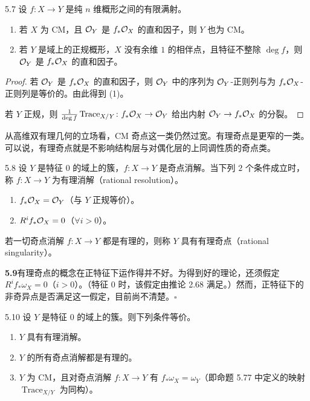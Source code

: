 
\begin{propositionp}{5.7}
设 $f\colon X\to Y$ 是纯 $n$ 维概形之间的有限满射。
\begin{enumerate}[label=(\arabic*),leftmargin=*]
\item 若 $X$ 为 CM，且 $\mathcal{O}_Y$ 是 $f_*\mathcal{O}_X$ 的直和因子，则 $Y$ 也为 CM。
\item 若 $Y$ 是域上的正规概形，$X$ 没有余维 $1$ 的相伴点，且特征不整除 $\deg f$，则 $\mathcal{O}_Y$ 是 $f_*\mathcal{O}_X$ 的直和因子。
\end{enumerate}
\end{propositionp}

\begin{proof}
若 $\mathcal{O}_Y$ 是 $f_*\mathcal{O}_X$ 的直和因子，则 $\mathcal{O}_Y$ 中的序列为 $\mathcal{O}_Y$-正则列与为 $f_*\mathcal{O}_X$-正则列是等价的。由此得到 (1)。

若 $Y$ 正规，则 $\frac{1}{\deg f}\operatorname{Trace}_{X/Y}\colon f_*\mathcal{O}_X\to\mathcal{O}_Y$ 给出内射 $\mathcal{O}_Y\to f_*\mathcal{O}_X$ 的分裂。
\end{proof}

从高维双有理几何的立场看，CM 奇点这一类仍然过宽。有理奇点是更窄的一类。可以说，有理奇点就是不影响结构层与对偶化层的上同调性质的奇点类。

\begin{definition}{5.8}
设 $Y$ 是特征 $0$ 的域上的簇，$f\colon X\to Y$ 是奇点消解。当下列 $2$ 个条件成立时，称 $f\colon X\to Y$ 为有理消解（rational resolution）。
\begin{enumerate}[label=(\arabic*),leftmargin=*]
\item $f_*\mathcal{O}_X=\mathcal{O}_Y$（与 $Y$ 正规等价）。
\item $R^if_*\mathcal{O}_X=0$（$\forall i>0$）。
\end{enumerate}
若一切奇点消解 $f\colon X\to Y$ 都是有理的，则称 $Y$ 具有有理奇点（rational singularity）。
\end{definition}

\par\medskip\noindent\textbf{5.9}\quad 有理奇点的概念在正特征下运作得并不好。为得到好的理论，还须假定 $R^if_*\omega_X=0$（$i>0$）。（特征 $0$ 时，该假定由推论 2.68 满足。）然而，正特征下的非奇异点是否满足这一假定，目前尚不清楚。\hfill$\square$

\begin{theorem*}{5.10}
设 $Y$ 是特征 $0$ 的域上的簇。则下列条件等价。
\begin{enumerate}[label=(\arabic*),leftmargin=*]
\item $Y$ 具有有理消解。
\item $Y$ 的所有奇点消解都是有理的。
\item $Y$ 为 CM，且对奇点消解 $f\colon X\to Y$ 有 $f_*\omega_X=\omega_Y$（即命题 5.77 中定义的映射 $\operatorname{Trace}_{X/Y}$ 为同构）。
\end{enumerate}
\end{theorem*}

